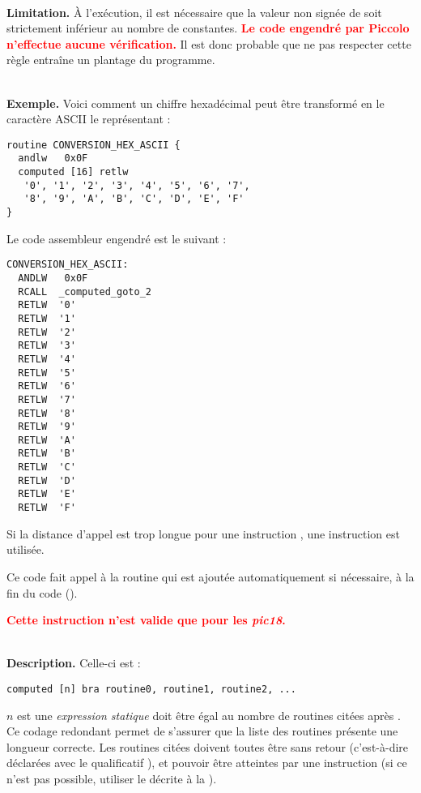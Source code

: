 ~\\
\textbf{Limitation.} À l'exécution, il est nécessaire que la valeur non signée de  soit strictement inférieur au nombre de constantes. \textcolor{red}{\bf Le code engendré par Piccolo n'effectue aucune vérification.} Il est donc probable que ne pas respecter cette règle entraîne un plantage du programme.


~\\
\textbf{Exemple.} Voici comment un chiffre hexadécimal peut être transformé en le caractère ASCII le représentant :
\begin{lstlisting}[language=piccolo]
routine CONVERSION_HEX_ASCII {
  andlw   0x0F
  computed [16] retlw
   '0', '1', '2', '3', '4', '5', '6', '7',
   '8', '9', 'A', 'B', 'C', 'D', 'E', 'F'
}
\end{lstlisting}

Le code assembleur engendré est le suivant :
\begin{lstlisting}[language=assembleur]
CONVERSION_HEX_ASCII:
  ANDLW   0x0F
  RCALL  _computed_goto_2
  RETLW  '0'
  RETLW  '1'
  RETLW  '2'
  RETLW  '3'
  RETLW  '4'
  RETLW  '5'
  RETLW  '6'
  RETLW  '7'
  RETLW  '8'
  RETLW  '9'
  RETLW  'A'
  RETLW  'B'
  RETLW  'C'
  RETLW  'D'
  RETLW  'E'
  RETLW  'F'
\end{lstlisting}

Si la distance d'appel est trop longue pour une instruction , une instruction  est utilisée.

Ce code fait appel à la routine  qui est ajoutée automatiquement si nécessaire, à la fin du code (). 


\textcolor{red}{\bf Cette instruction n'est valide que pour les \emph{pic18}.}

~\\
\textbf{Description.} Celle-ci est :
\begin{lstlisting}[language=piccolo]
computed [n] bra routine0, routine1, routine2, ...
\end{lstlisting}

$n$ est une \emph{expression statique} doit être égal au nombre de routines citées après . Ce codage redondant permet de s'assurer que la liste des routines présente une longueur correcte. Les routines citées doivent toutes être sans retour (c'est-à-dire déclarées avec le qualificatif ), et pouvoir être atteintes par une instruction  (si ce n'est pas possible, utiliser le  décrite à la ).

